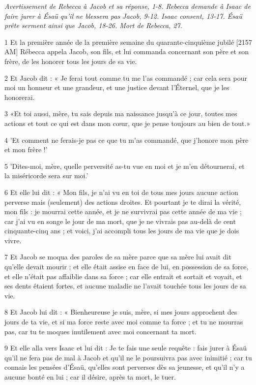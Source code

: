 
\par \textit{Avertissement de Rebecca à Jacob et sa réponse, 1-8. Rebecca demande à Isaac de faire jurer à Ésaü qu'il ne blessera pas Jacob, 9-12. Isaac consent, 13-17. Ésaü prête serment ainsi que Jacob, 18-26. Mort de Rebecca, 27.}

\par 1 Et la première année de la première semaine du quarante-cinquième jubilé [2157 AM] Rébecca appela Jacob, son fils, et lui commanda concernant son père et son frère, de les honorer tous les jours de sa vie.
\par 2 Et Jacob dit : « Je ferai tout comme tu me l'as commandé ; car cela sera pour moi un honneur et une grandeur, et une justice devant l'Éternel, que je les honorerai.
\par 3 «Et toi aussi, mère, tu sais depuis ma naissance jusqu'à ce jour, toutes mes actions et tout ce qui est dans mon cœur, que je pense toujours au bien de tout.»
\par 4 'Et comment ne ferais-je pas ce que tu m'as commandé, que j'honore mon père et mon frère !'
\par 5 'Dites-moi, mère, quelle perversité as-tu vue en moi et je m'en détournerai, et la miséricorde sera sur moi.'
\par 6 Et elle lui dit : « Mon fils, je n'ai vu en toi de tous mes jours aucune action perverse mais (seulement) des actions droites. Et pourtant je te dirai la vérité, mon fils : je mourrai cette année, et je ne survivrai pas cette année de ma vie ; car j'ai vu en songe le jour de ma mort, que je ne vivrais pas au-delà de cent cinquante-cinq ans ; et voici, j'ai accompli tous les jours de ma vie que je dois vivre.
\par 7 Et Jacob se moqua des paroles de sa mère parce que sa mère lui avait dit qu'elle devait mourir ; et elle était assise en face de lui, en possession de sa force, et elle n'était pas affaiblie dans sa force ; car elle entrait et sortait et voyait, et ses dents étaient fortes, et aucune maladie ne l'avait touchée tous les jours de sa vie.
\par 8 Et Jacob lui dit : « Bienheureuse je suis, mère, si mes jours approchent des jours de ta vie, et si ma force reste avec moi comme ta force ; et tu ne mourras pas, car tu te moques inutilement avec moi concernant ta mort.
\par 9 Et elle alla vers Isaac et lui dit : Je te fais une seule requête : fais jurer à Ésaü qu'il ne fera pas de mal à Jacob et qu'il ne le poursuivra pas avec inimitié ; car tu connais les pensées d'Ésaü, qu'elles sont perverses dès sa jeunesse, et qu'il n'y a aucune bonté en lui ; car il désire, après ta mort, le tuer.
